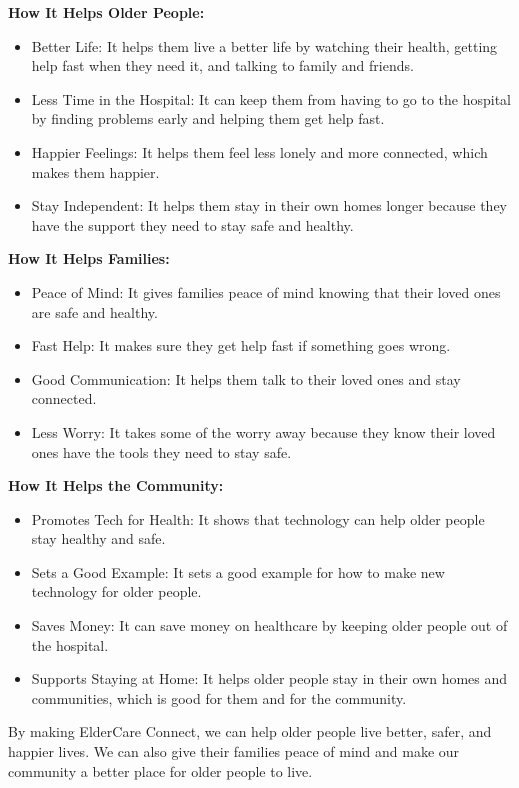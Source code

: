 \textbf{How It Helps Older People:}
\begin{itemize}
    \item Better Life: It helps them live a better life by watching their health, getting help fast when they need it, and talking to family and friends.
    \item Less Time in the Hospital: It can keep them from having to go to the hospital by finding problems early and helping them get help fast.
    \item Happier Feelings: It helps them feel less lonely and more connected, which makes them happier.
    \item Stay Independent: It helps them stay in their own homes longer because they have the support they need to stay safe and healthy.
\end{itemize}
\textbf{How It Helps Families:}
\begin{itemize}
    \item Peace of Mind: It gives families peace of mind knowing that their loved ones are safe and healthy.
    \item Fast Help: It makes sure they get help fast if something goes wrong.
    \item Good Communication: It helps them talk to their loved ones and stay connected.
    \item Less Worry: It takes some of the worry away because they know their loved ones have the tools they need to stay safe.
\end{itemize}
\textbf{How It Helps the Community:}
\begin{itemize}
    \item Promotes Tech for Health: It shows that technology can help older people stay healthy and safe.
    \item Sets a Good Example: It sets a good example for how to make new technology for older people.
    \item Saves Money: It can save money on healthcare by keeping older people out of the hospital.
    \item Supports Staying at Home: It helps older people stay in their own homes and communities, which is good for them and for the community.
\end{itemize}
By making ElderCare Connect, we can help older people live better, safer, and happier lives. We can also give their families peace of mind and make our community a better place for older people to live.